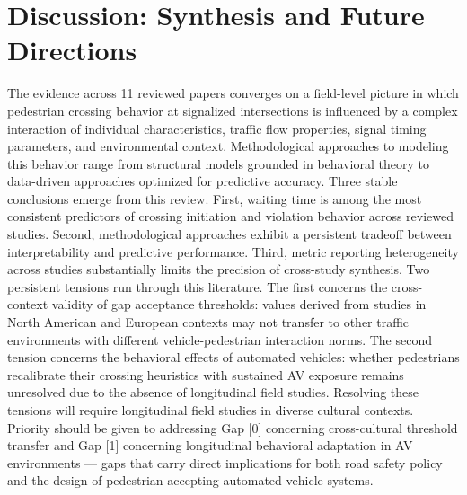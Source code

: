 \documentclass{article}
\begin{document}
\section{Discussion: Synthesis and Future Directions}
The evidence across 11 reviewed papers converges on a field-level picture in which pedestrian crossing behavior at signalized intersections is influenced by a complex interaction of individual characteristics, traffic flow properties, signal timing parameters, and environmental context. Methodological approaches to modeling this behavior range from structural models grounded in behavioral theory to data-driven approaches optimized for predictive accuracy. Three stable conclusions emerge from this review. First, waiting time is among the most consistent predictors of crossing initiation and violation behavior across reviewed studies. Second, methodological approaches exhibit a persistent tradeoff between interpretability and predictive performance. Third, metric reporting heterogeneity across studies substantially limits the precision of cross-study synthesis. Two persistent tensions run through this literature. The first concerns the cross-context validity of gap acceptance thresholds: values derived from studies in North American and European contexts may not transfer to other traffic environments with different vehicle-pedestrian interaction norms. The second tension concerns the behavioral effects of automated vehicles: whether pedestrians recalibrate their crossing heuristics with sustained AV exposure remains unresolved due to the absence of longitudinal field studies. Resolving these tensions will require longitudinal field studies in diverse cultural contexts. Priority should be given to addressing Gap [0] concerning cross-cultural threshold transfer and Gap [1] concerning longitudinal behavioral adaptation in AV environments — gaps that carry direct implications for both road safety policy and the design of pedestrian-accepting automated vehicle systems.
\end{document}
